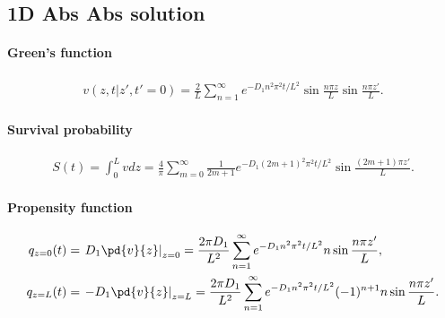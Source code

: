 \subsection{1D Abs Abs solution}

\paragraph{Green's function}
\begin{align}
  v(z,t|z',t'=0) = \frac{2}{L}\sum_{n=1}^{\infty}
  e^{-D_1n^2\pi^2t/L^2} \sin\frac{n\pi z}{L} \sin\frac{n\pi z'}{L}.
\end{align}


\paragraph{Survival probability}
\begin{align}
  S(t) = \int_0^L v dz = \frac{4}{\pi} \sum_{m=0}^{\infty} \frac{1}{2m+1}
  e^{-D_1(2m+1)^2\pi^2t/L^2} \sin\frac{(2m+1)\pi z'}{L}.
\end{align}


\paragraph{Propensity function}
\begin{align}
  q_{z=0}(t) &= \left.D_1 \pd{v}{z}\right|_{z=0} = \frac{2\pi D_1}{L^2} 
  \sum_{n=1}^{\infty} e^{-D_1n^2\pi^2t/L^2} n \sin\frac{n\pi z'}{L},\\
  q_{z=L}(t) &= \left.- D_1 \pd{v}{z}\right|_{z=L} = \frac{2\pi D_1}{L^2} 
  \sum_{n=1}^{\infty} e^{-D_1n^2\pi^2t/L^2} (-1)^{n+1} n \sin\frac{n\pi 
  z'}{L}.
\end{align}
